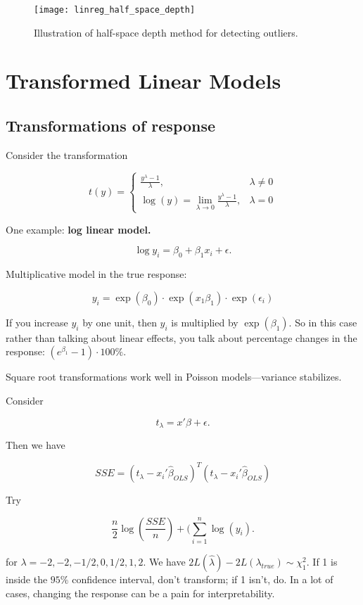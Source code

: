 \begin{figure}[htbp]
\begin{center}
\texttt{[image: linreg\_half\_space\_depth]}
\caption{Illustration of half-space depth method for detecting outliers.}
\label{linreg.fig.half.space.depth}
\end{center}
\end{figure}


\section{Transformed Linear Models}

\subsection{Transformations of response}

Consider the transformation

\[
t(y) = \begin{cases}
\frac{y^\lambda - 1}{\lambda} , & \lambda \neq 0 \\
\log(y) = \lim_{\lambda \to 0} \frac{y^\lambda - 1}{\lambda}, & \lambda = 0 
\end{cases}
\]

One example: \textbf{log linear model.}

\[
\log y_i = \beta_0 + \beta_1 x_i + \epsilon.
\]

Multiplicative model in the true response:

\[
y_i = \exp(\beta_0) \cdot \exp(x_1 \beta_1)  \cdot \exp(\epsilon_i)
\]

If you increase \(y_i\) by one unit, then \(y_i\) is multiplied by \(\exp(\beta_1)\). So in this case rather than talking about linear effects, you talk about percentage changes in the response: \((e^{\beta_1} - 1) \cdot 100 \%\).

Square root transformations work well in Poisson models---variance stabilizes. 

Consider

\[
t_\lambda = x'\beta + \epsilon.
\]

Then we have

\[
SSE = (t_\lambda - x_i' \hat{\beta}_{OLS})^T(t_\lambda - x_i' \hat{\beta}_{OLS}) 
\]

Try

\[
\frac{n}{2} \log \left(  \frac{SSE}{n} \right) + (\sum_{i=1}^n \log(y_i).
\]

for \(\lambda= -2, -2, -1/2, 0, 1/2, 1, 2\). We have \(2 L(\hat{\lambda}) - 2 L(\lambda_{true}) \sim \chi_1^2\). If 1 is inside the \(95\%\) confidence interval, don't transform; if 1 isn't, do. In a lot of cases, changing the response can be a pain for interpretability.

